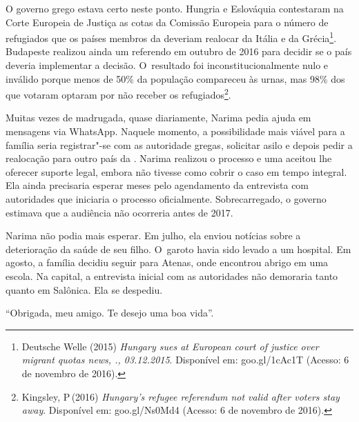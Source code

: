 O governo grego estava certo neste ponto. Hungria e Eslováquia contestaram na
Corte Europeia de Justiça as cotas da Comissão Europeia para o número de
refugiados que os países membros da  deveriam realocar da Itália e da
Grécia\footnote{ Deutsche Welle (2015) \emph{Hungary sues  at
European court of justice over migrant quotas \textbar{} news,
., 03.12.2015}. Disponível em:
goo.gl/1cAc1T
(Acesso: 6 de novembro de 2016).}. Budapeste realizou ainda um referendo em
outubro de 2016 para decidir se o país deveria implementar a decisão. O~resultado foi inconstitucionalmente nulo e inválido porque menos de 50\%
da população compareceu às urnas, mas 98\% dos que votaram optaram por
não receber os refugiados\footnote{ Kingsley, P\,(2016) \emph{Hungary's refugee
referendum not valid after voters stay away}. Disponível em:
goo.gl/Ns0Md4
(Acesso: 6 de novembro de 2016).}.

Muitas vezes de madrugada, quase diariamente, Narima pedia ajuda em
mensagens via WhatsApp. Naquele momento, a possibilidade mais viável
para a família seria registrar"-se com as autoridade gregas, solicitar
asilo e depois pedir a realocação para outro país da . Narima realizou
o processo e uma  aceitou lhe oferecer suporte legal, embora não
tivesse como cobrir o caso em tempo integral. Ela ainda precisaria
esperar meses pelo agendamento da entrevista com autoridades que
iniciaria o processo oficialmente. Sobrecarregado, o governo estimava
que a audiência não ocorreria antes de 2017.

Narima não podia mais esperar. Em julho, ela enviou notícias sobre a
deterioração da saúde de seu filho. O~garoto havia sido levado a um
hospital. Em agosto, a família decidiu seguir para Atenas, onde encontrou
abrigo em uma escola. Na capital, a entrevista inicial com as
autoridades não demoraria tanto quanto em Salônica. Ela se despediu.

``Obrigada, meu amigo. Te desejo uma boa vida''.


